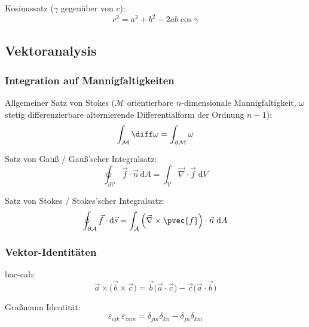 \documentclass[11pt]{article}
\numberwithin{equation}{section}
\begin{document}
        Kosinussatz ($\gamma$ gegenüber von $c$):
        \begin{equation}
          c^2 = a^2 + b^2 -2ab \cos\gamma
        \end{equation}


		\subsection{Vektoranalysis}
      \subsubsection{Integration auf Mannigfaltigkeiten}
        Allgemeiner Satz von Stokes ($\mathcal{M}$ orientierbare $n$-dimensionale Mannigfaltigkeit, $\omega$ stetig differenzierbare alternierende Differentialform der Ordnung $n-1$):
        \begin{equation}
          \int_\mathcal{M} \diff \omega = \int_{\partial\mathcal{M}} \omega
        \end{equation}

        Satz von Gauß / Gauß'scher Integralsatz:
        \begin{equation}
          \oint_{\partial\mathcal{V}}\vec{f}\cdot\vec{n}\,\mathrm{d}A=\int_{\mathcal{V}}\vec{\nabla}\cdot\vec{f}\;\mathrm{d}V
        \end{equation}

        Satz von Stokes / Stokes'scher Integralsatz:
        \begin{equation}
          \oint_{\partial\mathcal{A}}\vec{f}\cdot\mathrm{d}\vec{s}=\int_{\mathcal{A}}\left(\vec{\nabla}\times\pvec{f}\right)\cdot\vec{n}\;\mathrm{d}A
        \end{equation}

      \subsubsection{Vektor-Identitäten}
        bac-cab:
        \begin{equation}
          \vec{a}\times\big(\vec{b}\times\vec{c}\big) = \vec{b}\big(\vec{a}\cdot\vec{c}\big) - \vec{c}\big(\vec{a}\cdot\vec{b}\big)
        \end{equation}

        Graßmann Identität:
        \begin{equation}
          \varepsilon_{ijk}\,\varepsilon_{imn}=\delta_{jm}\delta_{kn}-\delta_{jn}\delta_{km}
        \end{equation}
\end{document}
